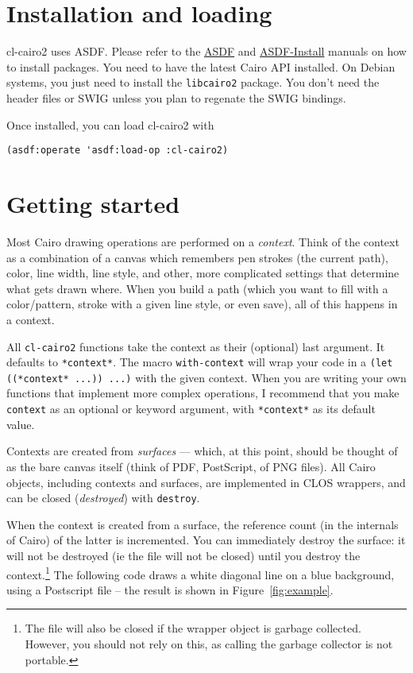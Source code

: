 \documentclass[12pt,letterpaper]{article}
\begin{document}
\section{Installation and loading}
\label{sec:installation-loading}

cl-cairo2 uses ASDF.  Please refer to the
\href{http://www.cliki.net/asdf}{ASDF} and
\href{http://www.cliki.net/ASDF-Install}{ASDF-Install} manuals on how
to install packages.  You need to have the latest Cairo API installed.
On Debian systems, you just need to install the \verb!libcairo2!
package.  You don't need the header files or SWIG unless you plan to
regenate the SWIG bindings.

Once installed, you can load cl-cairo2 with
\begin{lstlisting}
(asdf:operate 'asdf:load-op :cl-cairo2)
\end{lstlisting}

\section{Getting started}
\label{sec:getting-started}


Most Cairo drawing operations are performed on a \emph{context}.
Think of the context as a combination of a canvas which remembers pen
strokes (the current path), color, line width, line style, and other,
more complicated settings that determine what gets drawn where.  When
you build a path (which you want to fill with a color/pattern, stroke
with a given line style, or even save), all of this happens in a
context.

All \verb!cl-cairo2! functions take the context as their (optional)
last argument.  It defaults to \lstinline!*context*!.  The macro
\lstinline!with-context! will wrap your code in a
 \lstinline!(let ((*context* ...)) ...)! with the given context.
  When you are writing your
own functions that implement more complex operations, I recommend that
you make \lstinline!context! as an optional or keyword argument, with
\lstinline!*context*! as its default value.

Contexts are created from \emph{surfaces} --- which, at this point,
should be thought of as the bare canvas itself (think of PDF,
PostScript, of PNG files). All Cairo objects, including contexts and
surfaces, are implemented in CLOS wrappers, and can be closed
(\emph{destroyed}) with \lstinline!destroy!.

When the context is created from a surface, the reference count (in
the internals of Cairo) of the latter is incremented.  You can
immediately destroy the surface: it will not be destroyed (ie the file
will not be closed) until you destroy the context.\footnote{The file
  will also be closed if the wrapper object is garbage collected.
  However, you should not rely on this, as calling the garbage
  collector is not portable.}  The following code draws a white
diagonal line on a blue background, using a Postscript file -- the
result is shown in Figure~\ref{fig:example}.
\end{document}
